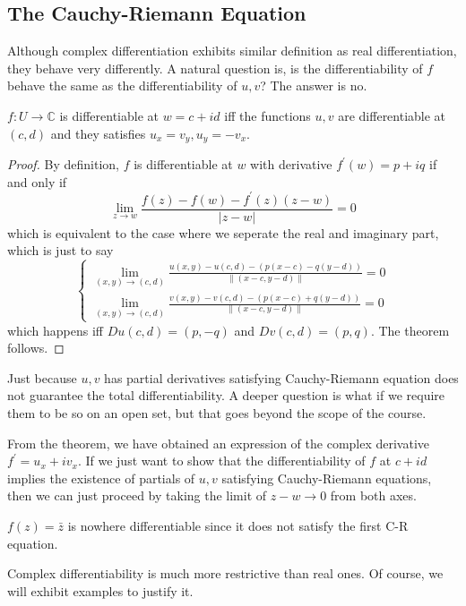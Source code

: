 \subsection{The Cauchy-Riemann Equation}
Although complex differentiation exhibits similar definition as real differentiation, they behave very differently.
A natural question is, is the differentiability of $f$ behave the same as the differentiability of $u,v$?
The answer is no.
\begin{theorem}
    $f:U\to\mathbb C$ is differentiable at $w=c+id$ iff the functions $u,v$ are differentiable at $(c,d)$ and they satisfies $u_x=v_y,u_y=-v_x$.
\end{theorem}
\begin{proof}
    By definition, $f$ is differentiable at $w$ with derivative $f^\prime(w)=p+iq$ if and only if
    $$\lim_{z\to w}\frac{f(z)-f(w)-f^\prime(z)(z-w)}{|z-w|}=0$$
    which is equivalent to the case where we seperate the real and imaginary part, which is just to say
    $$
    \begin{cases}
        \lim_{(x,y)\to(c,d)}\frac{u(x,y)-u(c,d)-(p(x-c)-q(y-d))}{\|(x-c,y-d)\|}=0\\
        \lim_{(x,y)\to(c,d)}\frac{v(x,y)-v(c,d)-(p(x-c)+q(y-d))}{\|(x-c,y-d)\|}=0
    \end{cases}$$
    which happens iff $Du(c,d)=(p,-q)$ and $Dv(c,d)=(p,q)$.
    The theorem follows.
\end{proof}
\begin{remark}
    Just because $u,v$ has partial derivatives satisfying Cauchy-Riemann equation does not guarantee the total differentiability.
    A deeper question is what if we require them to be so on an open set, but that goes beyond the scope of the course.
\end{remark}
From the theorem, we have obtained an expression of the complex derivative $f^\prime=u_x+iv_x$.
If we just want to show that the differentiability of $f$ at $c+id$ implies the existence of partials of $u,v$ satisfying Cauchy-Riemann equations, then we can just proceed by taking the limit of $z-w\to 0$ from both axes.
\begin{example}
    $f(z)=\bar{z}$ is nowhere differentiable since it does not satisfy the first C-R equation.
\end{example}
\begin{remark}
    Complex differentiability is much more restrictive than real ones.
    Of course, we will exhibit examples to justify it.
\end{remark}
